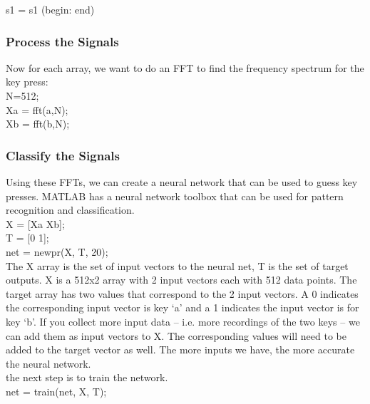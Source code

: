 \documentclass[12pt,a4paper]{article}
\begin{document}
s1 = s1 (begin: end)\\

\subsubsection{Process the Signals}

Now for each array, we want to do an FFT to find the frequency spectrum for the key press:\\

N=512;\\

Xa = fft(a,N);\\

Xb = fft(b,N);\\




\subsubsection{Classify the Signals}
Using these FFTs, we can create a neural network that can be used to guess key presses. MATLAB has a neural network toolbox that can be used for pattern recognition and classification.\\

X = [Xa Xb]; \\

T = [0 1];\\

net = newpr(X, T, 20); \\ 

The X array is the set of input vectors to the neural net, T is the set of target outputs. X is a 512x2 array with 2 input vectors each with 512 data points. The target array has two values that correspond to the 2 input vectors. A 0 indicates the corresponding input vector is key ‘a’ and a 1 indicates the input vector is for key ‘b’. If you collect more input data – i.e. more recordings of the two keys – we can add them as input vectors to X. The corresponding values will need to be added to the target vector as well. The more inputs we have, the more accurate the neural network.\\

the next step is to train the network.\\

net = train(net, X, T); \\
\end{document}
